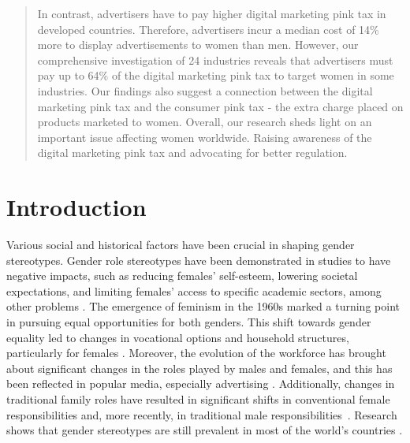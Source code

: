 \documentclass[twocolumn]{bmcart}\usepackage{lineno}
\begin{document}
\begin{frontmatter}
\begin{fmbox}
\begin{abstractbox}
\begin{abstract}
In contrast, advertisers have to pay higher digital marketing pink tax in developed countries. Therefore, advertisers incur a median cost of 14\% more to display advertisements to women than men. However, our comprehensive investigation of 24 industries reveals that advertisers must pay up to 64\% of the digital marketing pink tax to target women in some industries. Our findings also suggest a connection between the digital marketing pink tax and the consumer pink tax - the extra charge placed on products marketed to women. Overall, our research sheds light on an important issue affecting women worldwide. Raising awareness of the digital marketing pink tax and advocating for better regulation.
\color{black}

\end{abstract}



\begin{keyword}
\textcolor{blue}{}
\end{keyword}


\end{abstractbox}
\end{fmbox}

\end{frontmatter}

\section{Introduction}
\color{blue}
Various social and historical factors have been crucial in shaping gender stereotypes. Gender role stereotypes have been demonstrated in studies to have negative impacts, such as reducing females' self-esteem, lowering societal expectations, and limiting females' access to specific academic sectors, among other problems \cite{grau2016gender,lafky1996looking,cvencek2011math,sheehan2013controversies,young2018ogilvy}. 
The emergence of feminism in the 1960s marked a turning point in pursuing equal opportunities for both genders. This shift towards gender equality led to changes in vocational options and household structures, particularly for females \cite{lysonski1985role,plakoyiannaki2008images,plakoyiannaki2009female,zotos2014snapshots,beel2013impact}. Moreover, the evolution of the workforce has brought about significant changes in the roles played by males and females, and this has been reflected in popular media, especially advertising \cite{zotos1994gender}. Additionally, changes in traditional family roles have resulted in significant shifts in conventional female responsibilities and, more recently, in traditional male responsibilities~\cite{grau2016gender}. Research shows that gender stereotypes are still prevalent in most of the world's countries \cite{charlesworth2022patterns}.
\end{document}
